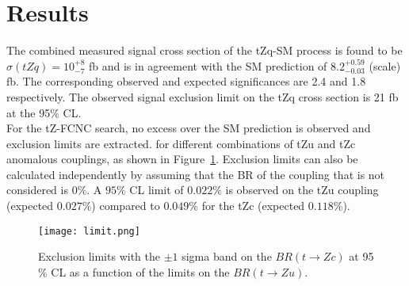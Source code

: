 \documentclass[12pt]{article}
\begin{document}
\section{Results}
 The combined measured signal cross section of the tZq-SM process is found to be $\sigma(tZq) = 10^{+8}_{-7}$ fb and is in agreement 
with the SM prediction of $ 8.2^{+0.59}_{-0.03}$ (scale) fb. The corresponding observed and expected significances are 2.4 and 1.8 respectively. The observed signal exclusion limit on the tZq cross section is 21 fb at the 95$\%$ CL.\\
For the tZ-FCNC search, no excess over the SM prediction is observed and exclusion limits are extracted. for different combinations of tZu and tZc anomalous couplings, as shown in Figure~\ref{fig:limit}. Exclusion limits can also be calculated independently by assuming that the BR of the coupling that is not considered is 0$\%$.  A  $95 \%$ CL   limit of $0.022\%$ is observed on the tZu coupling (expected $0.027\%$) compared to $0.049\%$ for the tZc (expected $0.118\%$).  

\begin{figure}[htb]
\centering
\texttt{[image: limit.png]}
\caption{Exclusion limits with the $\pm 1$ sigma band on the $BR(t\rightarrow Zc)$ at 95$\%$ CL  as a function of the limits on the $BR(t\rightarrow Zu)$. }
\label{fig:limit}
\end{figure}
\end{document}
